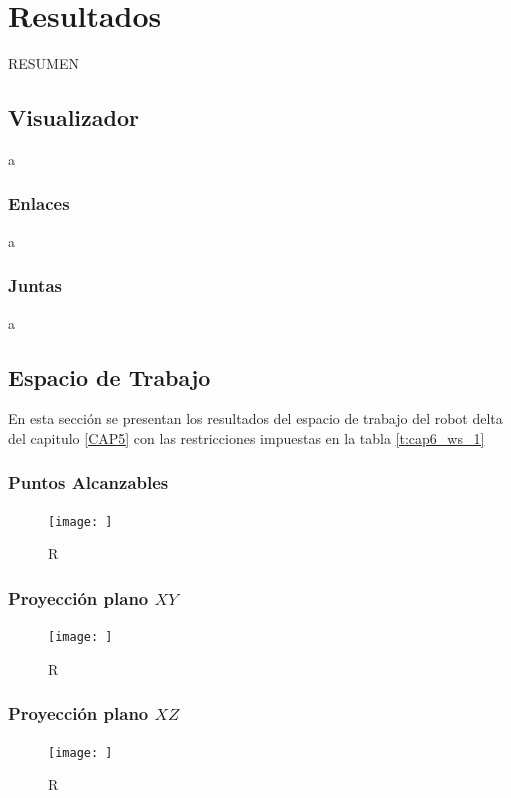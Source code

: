 \chapter{Resultados}\label{CAP7}
RESUMEN 

\section{Visualizador}
a
    \subsection{Enlaces}
    a
    
    \subsection{Juntas}
    a

\newpage

\section{Espacio de Trabajo}
        En esta sección se presentan los resultados del espacio de trabajo del robot delta del capitulo \ref{CAP5} con las restricciones impuestas en la tabla \ref{t:cap6_ws_1}
        
    \subsection{Puntos Alcanzables}
    
        \begin{figure}[h]
            \centering
            \texttt{[image: ]}
            \caption{R}
            \label{f:cap7_ws1}
        \end{figure}    
        
    \newpage

    
    \subsection{Proyección plano $XY$}
        \begin{figure}[h]
            \centering
            \texttt{[image: ]}
            \caption{R}
            \label{f:cap7_ws2}
        \end{figure}  
    
    \subsection{Proyección plano $XZ$}
        \begin{figure}[h]
            \centering
            \texttt{[image: ]}
            \caption{R}
            \label{f:cap7_ws3}
        \end{figure}  
        
